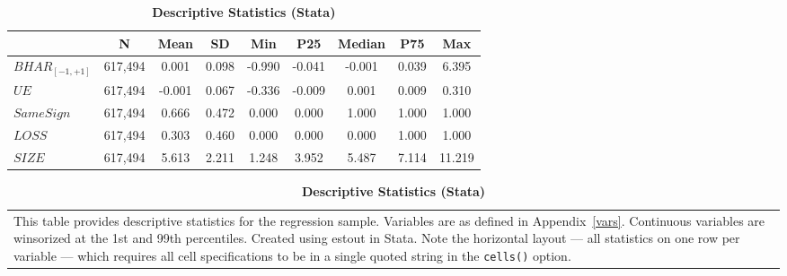 \documentclass[english,12pt]{article}
\begin{document}
\begin{table}[htbp]\centering\footnotesize{
\renewcommand{\arraystretch}{1.5}
\caption{\textbf{Descriptive Statistics (Stata)} \label{tab:descrip-stata}}

\begin{tabular}{l*{1}{cccccccc}}
\toprule
                &    N&     Mean&       SD&      Min&      P25&   Median&      P75&      Max\\
\midrule
$BHAR_{[-1,+1]}$&  617,494&    0.001&    0.098&   -0.990&   -0.041&   -0.001&    0.039&    6.395\\
$UE$           &  617,494&   -0.001&    0.067&   -0.336&   -0.009&    0.001&    0.009&    0.310\\
$SameSign$      &  617,494&    0.666&    0.472&    0.000&    0.000&    1.000&    1.000&    1.000\\
$LOSS$          &  617,494&    0.303&    0.460&    0.000&    0.000&    0.000&    1.000&    1.000\\
$SIZE$      &  617,494&    5.613&    2.211&    1.248&    3.952&    5.487&    7.114&   11.219\\
\bottomrule
\end{tabular}

\vspace{-1.5\baselineskip}
\singlespace
\flushleft
\begin{tabular}{@{}p{\linewidth}@{}}
\footnotesize
This table provides descriptive statistics for the regression sample. Variables are as defined in Appendix~\ref{vars}. Continuous variables are winsorized at the 1st and 99th percentiles. Created using estout in Stata. Note the horizontal layout --- all statistics on one row per variable --- which requires all cell specifications to be in a single quoted string in the \texttt{cells()} option.
\end{tabular}
}
\end{table}


\clearpage\newpage

\end{document}

